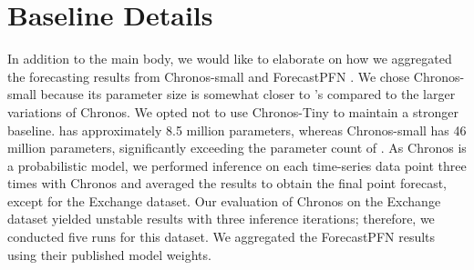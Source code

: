 \section{Baseline Details}
In addition to the main body, we would like to elaborate on how we aggregated the forecasting results from Chronos-small \cite{ansari2024chronos} and ForecastPFN \cite{dooley2023forecastpfn}. We chose Chronos-small because its parameter size is somewhat closer to \name's compared to the larger variations of Chronos. We opted not to use Chronos-Tiny to maintain a stronger baseline. \name has approximately 8.5 million parameters, whereas Chronos-small has 46 million parameters, significantly exceeding the parameter count of \name. As Chronos is a probabilistic model, we performed inference on each time-series data point three times with Chronos and averaged the results to obtain the final point forecast, except for the Exchange dataset. Our evaluation of Chronos on the Exchange dataset yielded unstable results with three inference iterations; therefore, we conducted five runs for this dataset. We aggregated the ForecastPFN results using their published model weights.